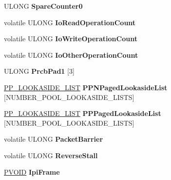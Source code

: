 \begin{DoxyCompactItemize}
U\+L\+O\+NG {\bfseries Spare\+Counter0}
\item 
\mbox{\label{struct___k_p_r_c_b_a2550d5549f0ab98d9c931238f586086f}} 
volatile U\+L\+O\+NG {\bfseries Io\+Read\+Operation\+Count}
\item 
\mbox{\label{struct___k_p_r_c_b_a0081460b6f13702a5647d260a4b96269}} 
volatile U\+L\+O\+NG {\bfseries Io\+Write\+Operation\+Count}
\item 
\mbox{\label{struct___k_p_r_c_b_a4c084e1aa8bd722d4b9ec6cd8dfa7a60}} 
volatile U\+L\+O\+NG {\bfseries Io\+Other\+Operation\+Count}
\item 
\mbox{\label{struct___k_p_r_c_b_a3f93437e2236b0d3fb542b05b81992d0}} 
U\+L\+O\+NG {\bfseries Prcb\+Pad1} \mbox{[}3\mbox{]}
\item 
\mbox{\label{struct___k_p_r_c_b_ae0d147943448b32fd34d26d95f942e96}} 
\hyperlink{struct___p_p___l_o_o_k_a_s_i_d_e___l_i_s_t}{P\+P\+\_\+\+L\+O\+O\+K\+A\+S\+I\+D\+E\+\_\+\+L\+I\+ST} {\bfseries P\+P\+N\+Paged\+Lookaside\+List} \mbox{[}N\+U\+M\+B\+E\+R\+\_\+\+P\+O\+O\+L\+\_\+\+L\+O\+O\+K\+A\+S\+I\+D\+E\+\_\+\+L\+I\+S\+TS\mbox{]}
\item 
\mbox{\label{struct___k_p_r_c_b_ab9f83a4eb0bb0f7f1169d97c3f7d840c}} 
\hyperlink{struct___p_p___l_o_o_k_a_s_i_d_e___l_i_s_t}{P\+P\+\_\+\+L\+O\+O\+K\+A\+S\+I\+D\+E\+\_\+\+L\+I\+ST} {\bfseries P\+P\+Paged\+Lookaside\+List} \mbox{[}N\+U\+M\+B\+E\+R\+\_\+\+P\+O\+O\+L\+\_\+\+L\+O\+O\+K\+A\+S\+I\+D\+E\+\_\+\+L\+I\+S\+TS\mbox{]}
\item 
\mbox{\label{struct___k_p_r_c_b_a69638e1ada99bf4a3629d4bf3b2ed53c}} 
volatile U\+L\+O\+NG {\bfseries Packet\+Barrier}
\item 
\mbox{\label{struct___k_p_r_c_b_a3534f97ece7064418fb715295bdd3002}} 
volatile U\+L\+O\+NG {\bfseries Reverse\+Stall}
\item 
\mbox{\label{struct___k_p_r_c_b_ac93ed1322aae2e03f3ffc329a96ed771}} 
\hyperlink{interfacevoid}{P\+V\+O\+ID} {\bfseries Ipi\+Frame}
\item 

\end{DoxyCompactItemize}
